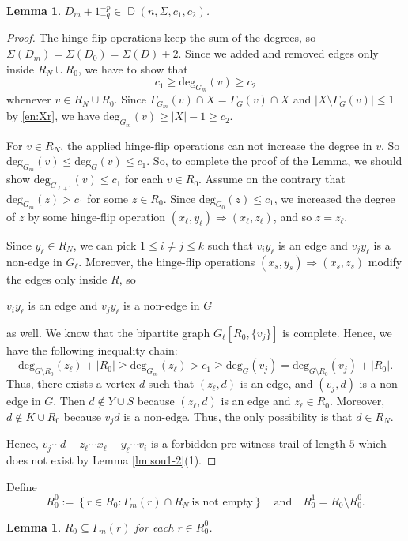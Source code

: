 \documentclass[11pt]{elsarticle}
\theoremstyle{plain}
\newtheorem{lemma}[theorem]{Lemma}
\theoremstyle{definition}
\def\deg{\mathrm{deg}}
\newcommand{\dds}[4]{\operatorname{\mathbb D}(#1,#2,#3,#4)}
\newcommand{\hflip}[3]{(#1,#2)\Rightarrow (#1,#3)}
\begin{document}
\begin{lemma}\label{lm:hinge1}
$D_m+1^{-p}_{-q}\in \dds{n}{\Sigma}{c_1}{c_2}$.
\end{lemma}
\begin{proof}
The hinge-flip operations  keep the sum of the degrees, so  $\Sigma(D_{m}) =  \Sigma(D_{0}) =\Sigma(D)+2$. Since we added and removed edges only inside $R_N\cup R_0$, we  have to show that $$c_1 \ge \deg_{G_m}(v) \ge c_2$$ whenever $v\in R_N\cup  R_0.$ Since $\Gamma_{G_m}(v)\cap X=\Gamma_{G}(v)\cap X$ and $|X\setminus \Gamma_{G}(v)|\le 1$ by \eqref{en:Xr}, we have $\deg_{G_m}(v)\ge |X|-1\ge c_2$.

For $v\in R_N$, the applied hinge-flip operations can not increase the degree in $v$. So $ \deg_{G_m}(v)\le \deg_G(v)\le c_1$.
 So, to complete the proof of the Lemma, we should show $\deg_{G_{\ell+1}}(v)\le c_1$ for each $v\in R_0$. Assume on the contrary that $\deg_{G_{m}}(z)>c_1$ for some $z\in R_0$. Since $\deg_{G_0}(z)\le c_1$, we increased the degree of $z$  by some   hinge-flip operation $\hflip{x_\ell}{y_\ell}{z_\ell}$, and so $z=z_\ell.$

Since $y_\ell\in R_N$, we can pick  $1\le i\ne j  \le k$  such that $v_iy_\ell$ is an edge and $v_jy_\ell$ is a non-edge in
$G_\ell$.   Moreover, the hinge-flip operations
$\hflip{x_s}{y_s}{z_s}$
modify the edges only inside $R$, so
\begin{center}
    $v_iy_\ell$ is an edge and $v_jy_\ell$ is a non-edge in $G$
\end{center}
as well. We know that the bipartite graph $G_\ell[R_0,\{v_j\}]$ is complete. Hence, we have the following inequality chain:
\begin{displaymath}
\deg_{G\setminus R_0}(z_\ell)+|R_0|\ge \deg_{G_m}(z_\ell)>c_1\ge \deg_G(v_j)= \deg_{G\setminus R_0}(v_j)+|R_0|.
\end{displaymath}
Thus,  there exists a vertex $d$ such that $(z_\ell,d)$ is an edge, and
$(v_j,d)$ is a non-edge in $G$. Then $d\notin Y\cup S$ because $(z_\ell,d)$ is an edge and $z_\ell \in R_0$. Moreover,  $d\notin K\cup R_0$ because $v_jd$ is a non-edge. Thus, the only possibility is that  $d\in R_N$.

Hence, $v_j\cdots d-z_\ell\cdots x_\ell- y_\ell\cdots  v_i$ is a forbidden pre-witness trail
of length $5$
which does not
exist by   Lemma \ref{lm:sou1-2}(1).
\end{proof}
\noindent Define
\begin{displaymath}
    R_0^0:=\left\{r\in R_0 : \Gamma_m(r) \cap R_N \ \text{is not empty}\right\}\quad \text{and}\quad R_0^1=R_0\setminus R_0^0.
\end{displaymath}
\begin{lemma}\label{lm:R00}
$R_0 \subseteq \Gamma_m(r)$ for each $r\in R^0_0$.
\end{lemma}
\end{document}
